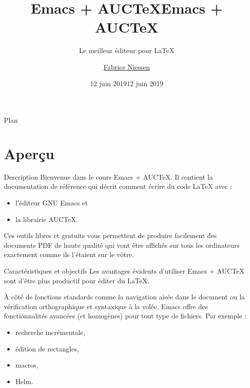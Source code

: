 \documentclass[t]{beamer}
\author{\href{mailto:fniessen@pirilampo.org}{Fabrice Niessen}}
\date{12 juin 2019}
\title{Emacs + AUCTeX}
\subtitle{Le meilleur éditeur pour \LaTeX}
\institute[Pirilampo]{}
\begin{document}
\title{Emacs + AUC\TeX{}}
\date[juin 2019]{12 juin 2019}
\begin{frame}[plain]
\maketitle
\end{frame}
\begin{frame}{Plan}
\tableofcontents
\end{frame}


\section{Aperçu}
\label{sec:orgaea732e}

\begin{frame}[label={sec:org2c51a58}]{Description}
Bienvenue dans le cours Emacs + AUC\TeX{}. Il contient la documentation de
référence qui décrit comment écrire du code \LaTeX{} avec :

\begin{itemize}
\item l'éditeur GNU Emacs et
\item la librairie AUC\TeX{}.
\end{itemize}

Ces outils \alert{libres} et \alert{gratuits} vous permettent de produire facilement des
documents \alert{PDF de haute qualité} qui vont être affichés sur tous les ordinateurs
exactement comme ils l'étaient sur le vôtre.
\end{frame}

\begin{frame}[label={sec:org7f5446d}]{Caractéristiques et objectifs}
Les avantages évidents d'utiliser Emacs + AUC\TeX{} sont d'être \alert{plus productif}
pour éditer du \LaTeX{}.

À côté de fonctions standards comme la navigation aisée dans le document ou la
vérification orthographique et syntaxique à la volée, Emacs offre des
\alert{fonctionnalités avancées} (et homogènes) pour tout \alert{type de fichiers}. Par
exemple :

\begin{itemize}
\item recherche incrémentale,
\item édition de rectangles,
\item macros,
\item Helm.
\end{itemize}
\end{frame}
\end{document}
